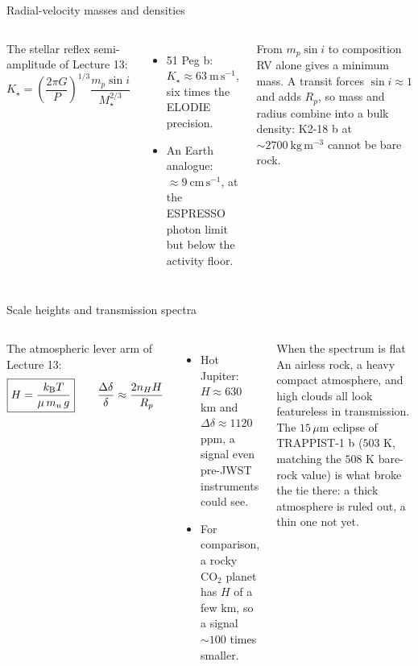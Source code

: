 \documentclass[aspectratio=169, 11pt]{beamer}
\begin{document}
\begin{frame}{Radial-velocity masses and densities}
  \small
  \begin{columns}[T]
    The stellar reflex semi-amplitude of Lecture 13:
    \[
      \boxed{K_\star = \left(\frac{2\pi G}{P}\right)^{1/3}\frac{m_p \sin i}{M_\star^{2/3}}}
    \]
    \begin{itemize}
      \item 51 Peg b: $K_\star \approx 63\ \mathrm{m\,s^{-1}}$, six times the ELODIE precision.
      \item An Earth analogue: $\approx 9\ \mathrm{cm\,s^{-1}}$, at the ESPRESSO photon limit but below the activity floor.
    \end{itemize}

    \begin{block}{From $m_p \sin i$ to composition}
      RV alone gives a minimum mass. A transit forces $\sin i \approx 1$ and adds $R_p$, so mass and radius combine into a bulk density: K2-18 b at $\sim 2700\ \mathrm{kg\,m^{-3}}$ cannot be bare rock.
    \end{block}
  \end{columns}
\end{frame}

\begin{frame}{Scale heights and transmission spectra}
  \small
  \begin{columns}[T]
    The atmospheric lever arm of Lecture 13:
    \[
      \boxed{H = \frac{k_{\mathrm{B}} T}{\mu\,m_u\,g}} \qquad \frac{\Delta\delta}{\delta} \approx \frac{2 n_H H}{R_p}
    \]
    \begin{itemize}
      \item Hot Jupiter: $H \approx 630$ km and $\Delta\delta \approx 1120$ ppm, a signal even pre-JWST instruments could see.
      \item For comparison, a rocky $\mathrm{CO_2}$ planet has $H$ of a few km, so a signal $\sim 100$ times smaller.
    \end{itemize}

    \begin{block}{When the spectrum is flat}
      An airless rock, a heavy compact atmosphere, and high clouds all look featureless in transmission. The $15\,\mu$m eclipse of TRAPPIST-1 b ($503$ K, matching the $508$ K bare-rock value) is what broke the tie there: a thick atmosphere is ruled out, a thin one not yet.
    \end{block}
  \end{columns}
\end{frame}
\end{document}
